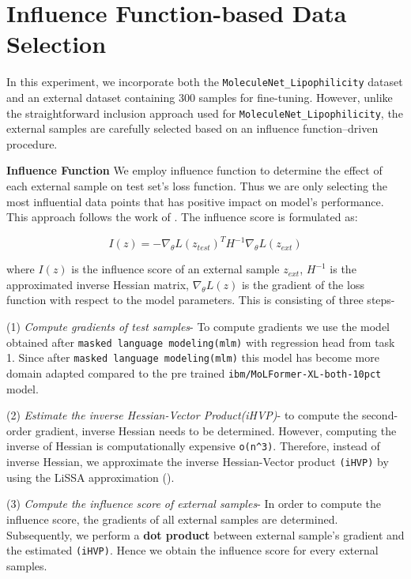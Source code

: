 \documentclass[11pt]{article}
\begin{document}
\section*{Influence Function-based Data Selection}

In this experiment, we incorporate both the \verb|MoleculeNet_Lipophilicity| dataset and an external dataset containing 300 samples for fine-tuning. However, unlike the straightforward inclusion approach used for \verb|MoleculeNet_Lipophilicity|, the external samples are carefully selected based on an influence function–driven procedure. 

\textbf{Influence Function} We employ influence function to determine the effect of each external sample on test set's loss function. Thus we are only selecting the most influential data points that has positive impact on model's performance. This approach follows the work of \cite{koh2020understandingblackboxpredictionsinfluence}. The influence score is formulated as:

\[
I(z) = - \nabla_{\theta} L(z_{test})^T H^{-1} \nabla_{\theta} L(z_{ext})
\]

where $I(z)$ is the influence score of an external sample $z_{ext}$, $H^{-1}$ is the approximated inverse Hessian matrix, $\nabla_{\theta} L(z)$ is the gradient of the loss function with respect to the model parameters. This is consisting of three steps-

(1) \textit{Compute gradients of test samples}- To compute gradients we use the model obtained after \verb|masked language modeling(mlm)| with regression head from task 1. Since after \verb|masked language modeling(mlm)| this model has become more domain adapted compared to the pre trained  \verb|ibm/MoLFormer-XL-both-10pct| model. 

(2) \textit{Estimate the inverse Hessian-Vector Product(iHVP)}- to compute the second-order gradient, inverse Hessian needs to be determined. However, computing the inverse of  Hessian is computationally expensive \verb|o(n^3)|. Therefore, instead of inverse Hessian, we approximate the inverse Hessian-Vector product \verb|(iHVP)| by using the LiSSA approximation (\cite{agarwal2017secondorderstochasticoptimizationmachine}).


(3)\textit{ Compute the influence score of external samples}- In order to compute the influence score, the gradients of all external samples are determined. Subsequently, we perform a \textbf{dot product} between external sample's gradient and the estimated \verb|(iHVP)|. Hence we obtain the influence score for every external samples.
\end{document}
